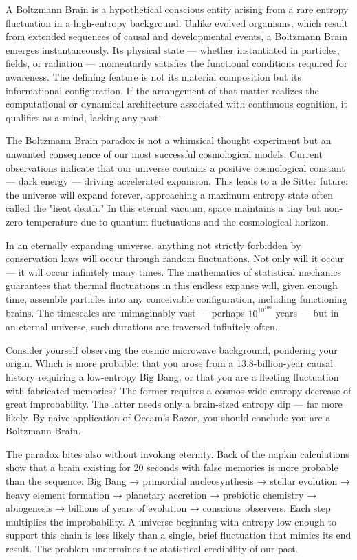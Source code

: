 A Boltzmann Brain is a hypothetical conscious entity arising from a rare entropy fluctuation in a high-entropy background. Unlike evolved organisms, which result from extended sequences of causal and developmental events, a Boltzmann Brain emerges instantaneously. Its physical state — whether instantiated in particles, fields, or radiation — momentarily satisfies the functional conditions required for awareness. The defining feature is not its material composition but its informational configuration. If the arrangement of that matter realizes the computational or dynamical architecture associated with continuous cognition, it qualifies as a mind, lacking any past.

The Boltzmann Brain paradox is not a whimsical thought experiment but an unwanted consequence of our most successful cosmological models. Current observations indicate that our universe contains a positive cosmological constant — dark energy — driving accelerated expansion. This leads to a de Sitter future: the universe will expand forever, approaching a maximum entropy state often called the "heat death." In this eternal vacuum, space maintains a tiny but non-zero temperature due to quantum fluctuations and the cosmological horizon.

In an eternally expanding universe, anything not strictly forbidden by conservation laws will occur through random fluctuations. Not only will it occur — it will occur infinitely many times. The mathematics of statistical mechanics guarantees that thermal fluctuations in this endless expanse will, given enough time, assemble particles into any conceivable configuration, including functioning brains. The timescales are unimaginably vast — perhaps $10^{10^{100}}$ years — but in an eternal universe, such durations are traversed infinitely often.

Consider yourself observing the cosmic microwave background, pondering your origin. Which is more probable: that you arose from a 13.8-billion-year causal history requiring a low-entropy Big Bang, or that you are a fleeting fluctuation with fabricated memories? The former requires a cosmos-wide entropy decrease of great improbability. The latter needs only a brain-sized entropy dip — far more likely. By naive application of Occam's Razor, you should conclude you are a Boltzmann Brain.

The paradox bites also without invoking eternity. Back of the napkin calculations show that a brain existing for 20 seconds with false memories is more probable than the sequence: Big Bang → primordial nucleosynthesis → stellar evolution → heavy element formation → planetary accretion → prebiotic chemistry → abiogenesis → billions of years of evolution → conscious observers. Each step multiplies the improbability. A universe beginning with entropy low enough to support this chain is less likely than a single, brief fluctuation that mimics its end result. The problem undermines the statistical credibility of our past.

